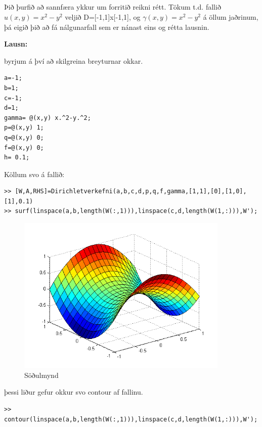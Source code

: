 \documentclass[11pt,a4paper,titlepage]{article}
\begin{document}
\subsection{}
Þið þurfið að sannfæra ykkur um forritið reikni rétt.  Tökum t.d. fallið $u(x,y)=x^2-y^2$ veljið D=[-1,1]x[-1,1], og $\gamma(x,y)=x^2-y^2$ á öllum jaðrinum, þá eigið þið að fá nálgunarfall sem er nánast eins og rétta lausnin.

\par
\textbf{Lausn:}\par
byrjum á því að skilgreina breyturnar okkar. 
\begin{verbatim}
a=-1;
b=1;
c=-1;
d=1;
gamma= @(x,y) x.^2-y.^2;
p=@(x,y) 1;
q=@(x,y) 0;
f=@(x,y) 0;
h= 0.1;
\end{verbatim}

Köllum svo á fallið:
\begin{verbatim}
>> [W,A,RHS]=Dirichletverkefni(a,b,c,d,p,q,f,gamma,[1,1],[0],[1,0],[1],0.1)
>> surf(linspace(a,b,length(W(:,1))),linspace(c,d,length(W(1,:))),W'); 
\end{verbatim}
 \begin{figure}[h!]
     \centering
     \includegraphics[width=0.9\textwidth]{sodulmynd1.png}
     \caption{Söðulmynd}
     \label{fig:awesome_image5}
 \end{figure}
 \newpage
þessi liður gefur okkur svo contour af fallinu. 
\begin{verbatim}
>> contour(linspace(a,b,length(W(:,1))),linspace(c,d,length(W(1,:))),W');
\end{verbatim}
\end{document}
